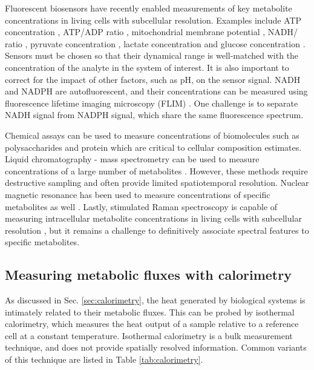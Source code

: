 \documentclass{compactarticle}
\begin{document}
Fluorescent biosensors have recently enabled measurements of key metabolite concentrations in living cells with subcellular resolution. Examples include ATP concentration \cite{imamura2009visualization}, ATP/ADP ratio \cite{berg2009genetically}, mitochondrial membrane potential \cite{perry2011mitochondrial}, NADH/ ratio \cite{hung2011imaging}, pyruvate concentration \cite{san2014imaging}, lactate concentration \cite{san2013genetically} and glucose concentration \cite{diaz2019quantitative}. Sensors must be chosen so that their dynamical range is well-matched with the concentration of the analyte in the system of interest. It is also important to correct for the impact of other factors, such as pH, on the sensor signal. NADH and NADPH are autofluorescent, and their concentrations can be measured using fluorescence lifetime imaging microscopy (FLIM) \cite{Yang2021elife,blacker2014separating}. One challenge is to separate NADH signal from NADPH signal, which share the same fluorescence spectrum.

Chemical assays can be used to measure concentrations of biomolecules such as polysaccharides and protein which are critical to cellular composition estimates. Liquid chromatography - mass spectrometry can be used to measure concentrations of a large number of metabolites \cite{park2016metabolite}. However, these methods require destructive sampling and often provide limited spatiotemporal resolution. Nuclear magnetic resonance has been used to measure concentrations of specific metabolites as well \cite{mason1992nmr}. Lastly, stimulated Raman spectroscopy is capable of measuring intracellular metabolite concentrations in living cells with subcellular resolution \cite{oh2019situ}, but it remains a challenge to definitively associate spectral features to specific metabolites.

\subsection{Measuring metabolic fluxes with calorimetry}

As discussed in Sec. \ref{sec:calorimetry}, the heat generated by biological systems is intimately related to their metabolic fluxes. This can be probed by isothermal calorimetry, which measures the heat output of a sample relative to a reference cell at a constant temperature. Isothermal calorimetry is a bulk measurement technique, and does not provide spatially resolved information. Common variants of this technique are listed in Table \ref{tab:calorimetry}.
\end{document}
